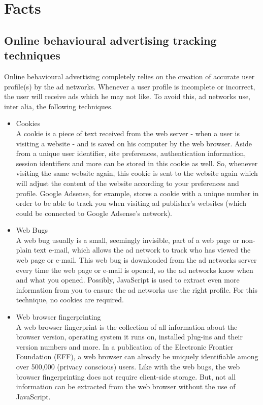 \documentclass[11pt]{article}
\newcommand{\OBA}{Online behavioural advertising }
\begin{document}
\section{Facts}
\subsection{\OBA tracking techniques}
\label{techniques}
Online behavioural advertising completely relies on the creation of accurate user profile(s) by the ad networks. Whenever a user profile is incomplete or incorrect, the user will receive ads which he may not like. To avoid this, ad networks use, inter alia, the following techniques.

\begin{itemize}
	\item Cookies\\
		A cookie is a piece of text received from the web server - when a user is visiting a website - and is saved on his computer by the web browser. Aside from a unique user identifier, site preferences, authentication information, session identifiers and more can be stored in this cookie as well. So, whenever visiting the same website again, this cookie is sent to the website again which will adjust the content of the website according to your preferences and profile. Google Adsense, for example, stores a cookie with a unique number in order to be able to track you when visiting ad publisher's websites (which could be connected to Google Adsense's network). \cite{Adsense2011}

	\item Web Bugs\\
		A web bug usually is a small, seemingly invisible, part of a web page or non-plain text e-mail, which allows the ad network to track who has viewed the web page or e-mail. This web bug is downloaded from the ad networks server every time the web page or e-mail is opened, so the ad networks know when and what you opened. Possibly, JavaScript is used to extract even more information from you to ensure the ad networks use the right profile. For this technique, no cookies are required.

	\item Web browser fingerprinting\\
		A web browser fingerprint is the collection of all information about the browser version, operating system it runs on, installed plug-ins and their version numbers and more. In a publication of the Electronic Frontier Foundation (EFF), a web browser can already be uniquely identifiable among over 500,000 (privacy conscious) users. \cite{EFF2010} Like with the web bugs, the web browser fingerprinting does not require client-side storage. But, not all information can be extracted from the web browser without the use of JavaScript.


\end{itemize}
\end{document}
